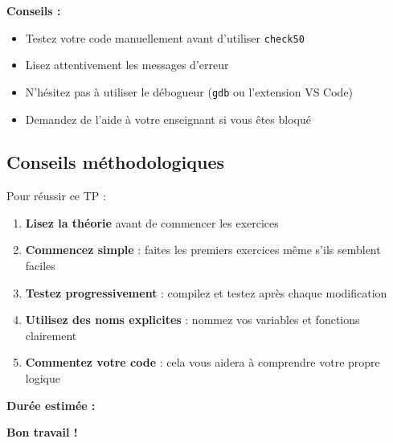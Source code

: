 \textbf{Conseils :}
\begin{itemize}
  \item Testez votre code manuellement avant d'utiliser \texttt{check50}
  \item Lisez attentivement les messages d'erreur
  \item N'hésitez pas à utiliser le débogueur (\texttt{gdb} ou l'extension VS Code)
  \item Demandez de l'aide à votre enseignant si vous êtes bloqué
\end{itemize}

\subsection*{Conseils méthodologiques}

Pour réussir ce TP :
\begin{enumerate}
  \item \textbf{Lisez la théorie} avant de commencer les exercices
  \item \textbf{Commencez simple} : faites les premiers exercices même s'ils semblent faciles
  \item \textbf{Testez progressivement} : compilez et testez après chaque modification
  \item \textbf{Utilisez des noms explicites} : nommez vos variables et fonctions clairement
  \item \textbf{Commentez votre code} : cela vous aidera à comprendre votre propre logique
\end{enumerate}

\textbf{Durée estimée :} \UPSTIduree

\vspace{1cm}

\begin{center}
  \textbf{Bon travail !}
\end{center}

\pagebreak
